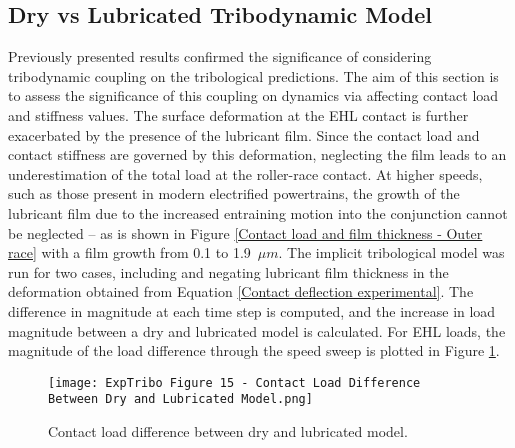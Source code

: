 \subsection{Dry vs Lubricated Tribodynamic Model}

Previously presented results confirmed the significance of considering tribodynamic coupling on the tribological predictions. The aim of this section is to assess the significance of this coupling on dynamics via affecting contact load and stiffness values. The surface deformation at the EHL contact is further exacerbated by the presence of the lubricant film. Since the contact load and contact stiffness are governed by this deformation, neglecting the film leads to an underestimation of the total load at the roller-race contact. At higher speeds, such as those present in modern electrified powertrains, the growth of the lubricant film due to the increased entraining motion into the conjunction cannot be neglected – as is shown in Figure \ref{Contact load and film thickness - Outer race} with a film growth from 0.1 to 1.9~$\mu m$. The implicit tribological model was run for two cases, including and negating lubricant film thickness in the deformation obtained from Equation \ref{Contact deflection experimental}. The difference in magnitude at each time step is computed, and the increase in load magnitude between a dry and lubricated model is calculated. For EHL loads, the magnitude of the load difference through the speed sweep is plotted in Figure \ref{Contact load difference between dry and lubricated model}.

\begin{figure}
	\centering
	\texttt{[image: ExpTribo Figure 15 - Contact Load Difference Between Dry and Lubricated Model.png]}
	\caption{Contact load difference between dry and lubricated model.}
	\label{Contact load difference between dry and lubricated model}
\end{figure} 

